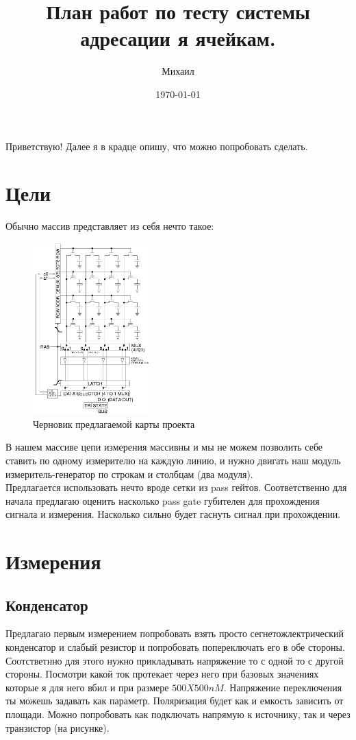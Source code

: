 \documentclass[a4paper,12pt]{article} %
\author{Михаил}
\title{План работ по тесту системы адресации я ячейкам.}
\date{\today}
\begin{document}

\maketitle
Приветствую! Далее я в крадце опишу, что можно попробовать сделать.
\section{Цели}

Обычно массив представляет из себя нечто такое:

\begin{figure}[H]
\centering
\includegraphics[width=0.4\textwidth]{Square_array_of_mosfet_cells_read.png}
\caption{ Черновик предлагаемой карты проекта}
\end{figure}

В нашем массиве цепи измерения массивны и мы не можем позволить себе ставить по одному измерителю на каждую линию, и нужно двигать наш модуль измеритель-генератор по строкам и столбцам (два модуля).\\
Предлагается использовать нечто вроде сетки из pass гейтов. Соответственно для начала предлагаю оценить насколько pass gate губителен для прохождения сигнала и измерения. Насколько сильно будет гаснуть сигнал при прохождении.
\section{Измерения}


\subsection{Конденсатор}
Предлагаю первым измерением попробовать взять просто сегнетожлектрический конденсатор и слабый резистор и попробовать попереключать его в обе стороны. Соотстветнно для этого нужно прикладывать напряжение то с одной то с другой стороны. Посмотри какой ток протекает через него при базовых значениях которые я для него вбил и при размере $500X500nM$. Напряжение переключения ты можешь задавать как параметр. Поляризация будет как и емкость зависить от площади. Можно попробовать как подключать напрямую к источнику, так и через транзистор (на рисунке).
\end{document}
